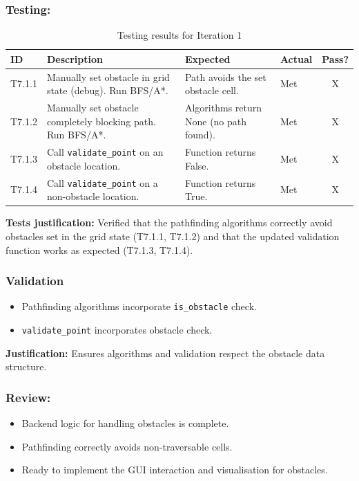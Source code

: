 \subsubsection{Testing:} %
\begin{table}[htbp]
	\centering
	\begin{tabularx}{\textwidth}{|l|X|p{4.5cm}|p{1.5cm}|c|}
		\hline
		\textbf{ID} & \textbf{Description} & \textbf{Expected} & \textbf{Actual} & \textbf{Pass?} \\
		\hline
		T7.1.1 & Manually set obstacle in grid state (debug). Run BFS/A*. & Path avoids the set obstacle cell. & Met & X \\
		\hline
		T7.1.2 & Manually set obstacle completely blocking path. Run BFS/A*. & Algorithms return None (no path found). & Met & X \\
		\hline
		T7.1.3 & Call \verb|validate_point| on an obstacle location. & Function returns False. & Met & X \\
		\hline
		T7.1.4 & Call \verb|validate_point| on a non-obstacle location. & Function returns True. & Met & X \\
		\hline
	\end{tabularx}
	\caption{Testing results for Iteration 1}
\end{table}
\textbf{Tests justification:} Verified that the pathfinding algorithms correctly avoid obstacles set in the grid state (T7.1.1, T7.1.2) and that the updated validation function works as expected (T7.1.3, T7.1.4).

\subsubsection{Validation}
\begin{itemize}
	\item Pathfinding algorithms incorporate \verb|is_obstacle| check.
	\item \verb|validate_point| incorporates obstacle check.
\end{itemize}
\textbf{Justification:} Ensures algorithms and validation respect the obstacle data structure.

\subsubsection{Review:}
\begin{itemize}
	\item Backend logic for handling obstacles is complete.
	\item Pathfinding correctly avoids non-traversable cells.
	\item Ready to implement the GUI interaction and visualisation for obstacles.
\end{itemize}

